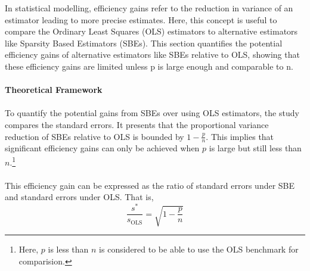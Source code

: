 In statistical modelling, efficiency gains refer to the reduction in variance of an estimator leading to more precise estimates. Here, this concept is useful to compare the Ordinary Least Squares (OLS) estimators to alternative estimators like Sparsity Based Estimators (SBEs). This section quantifies the potential efficiency gains of alternative estimators like SBEs relative to OLS, showing that these efficiency gains are limited unless p is large enough and comparable to n. \\
\\
\textbf{Theoretical Framework}\\
\\
To quantify the potential gains from SBEs over using OLS estimators, the study compares the standard errors. It presents that the proportional variance reduction of SBEs relative to OLS is bounded by $1- \frac{p}{n}$. This implies that significant efficiency gains can only be achieved when $p$ is large but still less than $n$.\footnote{Here, $p$ is less than $n$ is considered to be able to use the OLS benchmark for comparision.}\\
\\
This efficiency gain can be expressed as the ratio of standard errors under SBE and standard errors under OLS. That is, \\
\begin{equation}
    \frac{s^*}{s_{\text{OLS}}} = \sqrt{1 - \frac{p}{n}}
\end{equation}

